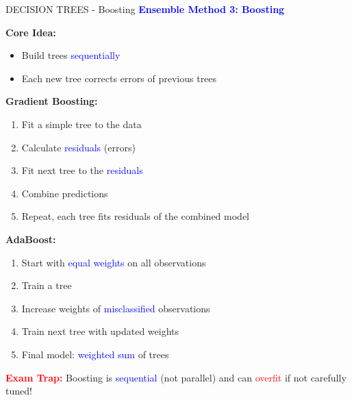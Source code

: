 \documentclass[8pt]{beamer}
\begin{document}
	\begin{frame}{DECISION TREES - Boosting}
		\fontsize{6.5}{7.5}\selectfont
		\textcolor{blue}{\textbf{Ensemble Method 3: Boosting}}
		
		\textbf{Core Idea:}
		\begin{itemize}
			\item Build trees \textcolor{blue}{sequentially}
			\item Each new tree corrects errors of previous trees
		\end{itemize}
		
		\textbf{Gradient Boosting:}
		\begin{enumerate}
			\item Fit a simple tree to the data
			\item Calculate \textcolor{blue}{residuals} (errors)
			\item Fit next tree to the \textcolor{blue}{residuals}
			\item Combine predictions
			\item Repeat, each tree fits residuals of the combined model
		\end{enumerate}
		
		\textbf{AdaBoost:}
		\begin{enumerate}
			\item Start with \textcolor{blue}{equal weights} on all observations
			\item Train a tree
			\item Increase weights of \textcolor{blue}{misclassified} observations
			\item Train next tree with updated weights
			\item Final model: \textcolor{blue}{weighted sum} of trees
		\end{enumerate}
		
		\textcolor{red}{\textbf{Exam Trap:}} Boosting is \textcolor{blue}{sequential} (not parallel) and can \textcolor{red}{overfit} if not carefully tuned!
	\end{frame}
	
\end{document}
